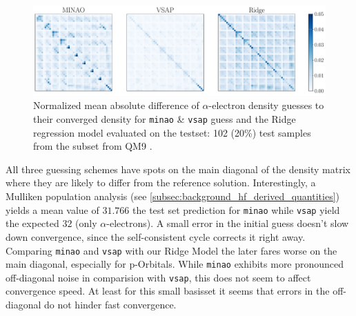 \begin{figure}[H]
    \centering
    \includegraphics[width=\textwidth]{../fig/c5h4n2o2/density_error_comparison.pdf}
    \caption[Normalized difference of density guesses]{Normalized mean absolute difference of $\alpha$-electron density guesses to their converged density for \texttt{minao} \& \texttt{vsap} guess and the Ridge regression model evaluated on the testset: 102 (20\%) test samples from the  subset from QM9 \parencite{ref:article1_qm9}.}
    \label{fig:density_error_comparison}
\end{figure}
All three guessing schemes have spots on the main diagonal of the density matrix where they are likely to differ from the reference solution. Interestingly, a Mulliken population analysis (see \autoref{subsec:background_hf_derived_quantities}) \parencite{ref:Mulliken_population_analysis} yields a mean value of $31.766$ the test set prediction for \texttt{minao} while \texttt{vsap} yield the expected $32$ (only $\alpha$-electrons). A small error in the initial guess doesn't slow down convergence, since the self-consistent cycle corrects it right away. Comparing \texttt{minao} and \texttt{vsap} with our Ridge Model the later fares worse on the main diagonal, especially for p-Orbitals. While \texttt{minao} exhibits more pronounced off-diagonal noise in comparision with \texttt{vsap}, this does not seem to affect convergence speed. At least for this small basisset it seems that errors in the off-diagonal do not hinder fast convergence.\\

